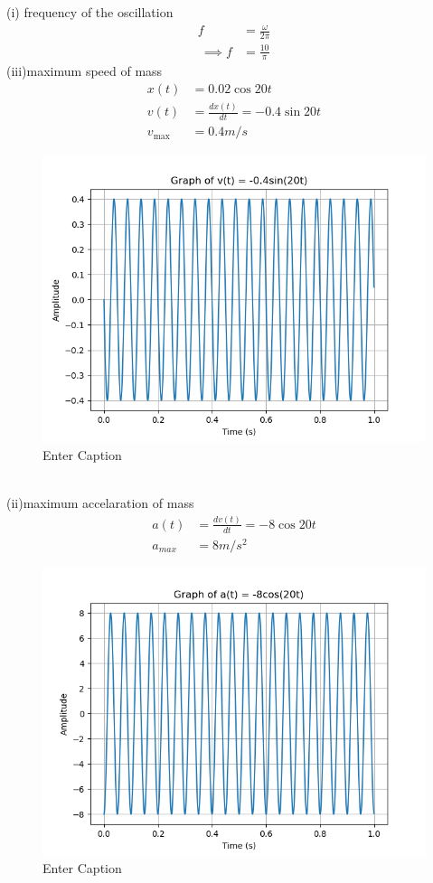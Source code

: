 \documentclass[journal,12pt,twocolumn]{IEEEtran}
\theoremstyle{remark}
\begin{document}
(i) frequency of the oscillation
\begin{align}
    f&=\frac{\omega}{2\pi}\\\
    \implies f&=\frac{10}{\pi}
\end{align}
(iii)maximum speed of mass\\
\begin{align}
    x(t)&=0.02\cos{20t}\\
    v(t)&=\frac{dx(t)}{dt}= -0.4\sin{20t}\\
    v_{\text{max}}&=0.4m/s    
\end{align}
\begin{figure}[h!]
    \centering
    \includegraphics[width=1.1\linewidth]{figs/analog2.png}
    \caption{Enter Caption}
    \label{fig:enter-label}
\end{figure}\\
(ii)maximum accelaration of mass\\
\begin{align}
    a(t)&=\frac{dv(t)}{dt}=-8\cos{20t}\\
    a_{max}&=8m/s^{2}
\end{align}
\begin{figure}[h!]
    \centering
    \includegraphics[width=1.1\linewidth]{figs/analog3.png}
    \caption{Enter Caption}
    \label{fig:enter-label}
\end{figure}
\end{document}
